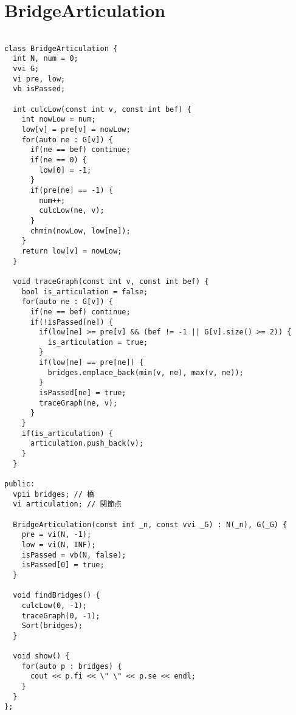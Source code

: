 \documentclass{jsarticle}
\begin{document}
\section{BridgeArticulation}
\color{black}
\begin{lstlisting}[caption=BridgeArticulation]

class BridgeArticulation {
  int N, num = 0;
  vvi G;
  vi pre, low;
  vb isPassed;

  int culcLow(const int v, const int bef) {
    int nowLow = num;
    low[v] = pre[v] = nowLow;
    for(auto ne : G[v]) {
      if(ne == bef) continue;
      if(ne == 0) {
        low[0] = -1;
      }
      if(pre[ne] == -1) {
        num++;
        culcLow(ne, v);
      }
      chmin(nowLow, low[ne]);
    }
    return low[v] = nowLow;
  }

  void traceGraph(const int v, const int bef) {
    bool is_articulation = false;
    for(auto ne : G[v]) {
      if(ne == bef) continue;
      if(!isPassed[ne]) {
        if(low[ne] >= pre[v] && (bef != -1 || G[v].size() >= 2)) {
          is_articulation = true;
        }
        if(low[ne] == pre[ne]) {
          bridges.emplace_back(min(v, ne), max(v, ne));
        }
        isPassed[ne] = true;
        traceGraph(ne, v);
      }
    }
    if(is_articulation) {
      articulation.push_back(v);
    }
  }

public:
  vpii bridges; // 橋
  vi articulation; // 関節点

  BridgeArticulation(const int _n, const vvi _G) : N(_n), G(_G) {
    pre = vi(N, -1);
    low = vi(N, INF);
    isPassed = vb(N, false);
    isPassed[0] = true;
  }

  void findBridges() {
    culcLow(0, -1);
    traceGraph(0, -1);
    Sort(bridges);
  }

  void show() {
    for(auto p : bridges) {
      cout << p.fi << \" \" << p.se << endl; 
    }
  }
};

\end{lstlisting}

\color{white}
\end{document}
